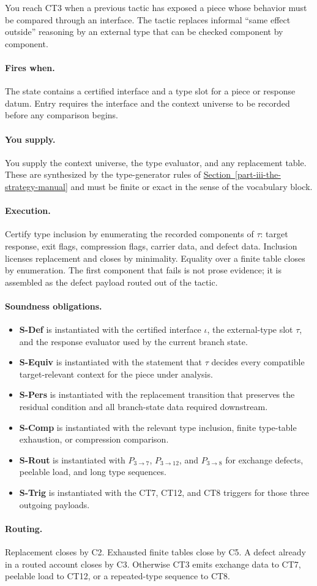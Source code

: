 \documentclass[
  11pt,
]{article}
\providecommand{\tightlist}{%
  \setlength{\itemsep}{0pt}\setlength{\parskip}{0pt}}
\theoremstyle{definition}
\newcommand{\secref}[1]{\hyperref[#1]{Section~\ref*{#1}}}
\newcommand{\ctpar}[1]{\paragraph{#1.}}
\begin{document}
You reach CT3 when a previous tactic has exposed a piece whose behavior
must be compared through an interface.  The tactic replaces informal
``same effect outside'' reasoning by an external type that can be
checked component by component.

\ctpar{Fires when}
The state contains a certified interface and a type slot for a piece or
response datum.  Entry requires the interface and the context universe to
be recorded before any comparison begins.

\ctpar{You supply}
You supply the context universe, the type evaluator, and any replacement
table.  These are synthesized by the type-generator rules of \secref{part-iii-the-strategy-manual} and
must be finite or exact in the sense of the vocabulary block.

\ctpar{Execution}
Certify type inclusion by enumerating the recorded components of
\(\tau\): target response, exit flags, compression flags, carrier data,
and defect data.  Inclusion licenses replacement and closes by
minimality.  Equality over a finite table closes by enumeration.  The
first component that fails is not prose evidence; it is assembled as the
defect payload routed out of the tactic.

\ctpar{Soundness obligations}
\begin{itemize}
\tightlist
\item \textbf{S-Def} is instantiated with the certified interface \(\iota\), the external-type slot \(\tau\), and the response evaluator used by the current branch state.
\item \textbf{S-Equiv} is instantiated with the statement that \(\tau\) decides every compatible target-relevant context for the piece under analysis.
\item \textbf{S-Pers} is instantiated with the replacement transition that preserves the residual condition and all branch-state data required downstream.
\item \textbf{S-Comp} is instantiated with the relevant type inclusion, finite type-table exhaustion, or compression comparison.
\item \textbf{S-Rout} is instantiated with \(P_{3\to7}\), \(P_{3\to12}\), and \(P_{3\to8}\) for exchange defects, peelable load, and long type sequences.
\item \textbf{S-Trig} is instantiated with the CT7, CT12, and CT8 triggers for those three outgoing payloads.
\end{itemize}

\ctpar{Routing}
Replacement closes by C2.  Exhausted finite tables close by C5.  A defect
already in a routed account closes by C3.  Otherwise CT3 emits exchange
data to CT7, peelable load to CT12, or a repeated-type sequence to CT8.
\end{document}
